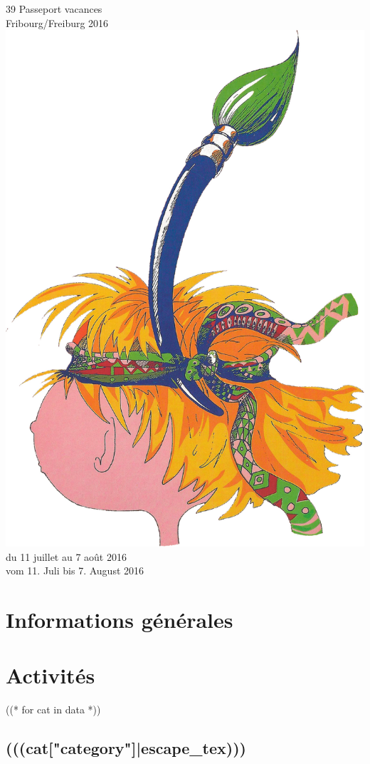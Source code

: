 \documentclass [parskip=full, paper=a4paper]{scrbook}
\begin{document}
\frontmatter
\begin{titlepage}
\begin{center}
{\fontsize{45}{40}\selectfont{}39\ieme{} Passeport vacances\\
\vspace*{3mm}
Fribourg/Freiburg 2016}
\vfill
\includegraphics[width=.7\textwidth]{logo.jpg}
\vfill
{\fontsize{32}{32}\selectfont{}du 11 juillet au 7 août 2016}\\
\vspace*{3mm}
{\fontsize{32}{32}\selectfont{}vom 11. Juli bis 7. August 2016}

\end{center}
\end{titlepage}
\cleardoublepage
\tableofcontents
\cleardoublepage

\mainmatter

\part{Informations générales}


\part{Activités}
((* for cat in data *))
\chapter{(((cat["category"]|escape_tex)))}
\end{document}

